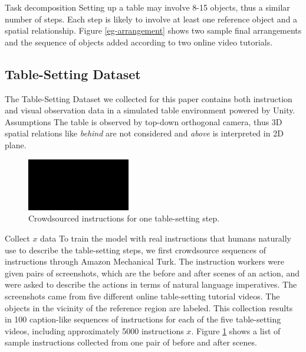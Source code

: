 \documentclass[conference]{IEEEtran}
\begin{document}
\color{red} Task decomposition \color{black} Setting up a table may involve 8-15 objects, thus a similar number of steps. Each step is likely to involve at least one reference object and a spatial relationship. Figure \ref{eg-arrangement} shows two sample final arrangements and the sequence of objects added according to two online video tutorials. 


\subsection{Table-Setting Dataset}

The Table-Setting Dataset we collected for this paper contains both instruction and visual observation data in a simulated table environment powered by Unity. \color{red} Assumptions \color{black} The table is observed by top-down orthogonal camera, thus 3D spatial relations like \textit{behind} are not considered and \textit{above} is interpreted in 2D plane. 

\begin{figure}[h]
\begin{center}
\includegraphics[width=0.40\textwidth]{sample}
\end{center}
\caption{Crowdsourced instructions for one table-setting step.}
\label{eg-instructions}
\end{figure}

\color{red} Collect $x$ data \color{black} To train the model with real instructions that humans naturally use to describe the table-setting steps, we first crowdsource sequences of instructions through Amazon Mechanical Turk. The instruction workers were given pairs of screenshots, which are the before and after scenes of an action, and were asked to describe the actions in terms of natural language imperatives. The screenshots came from five different online table-setting tutorial videos. The objects in the vicinity of the reference region are labeled. This collection results in 100 caption-like sequences of instructions for each of the five table-setting videos, including approximately 5000 instructions $x$. Figure \ref{eg-instructions} shows a list of sample instructions collected from one pair of before and after scenes.
\end{document}
